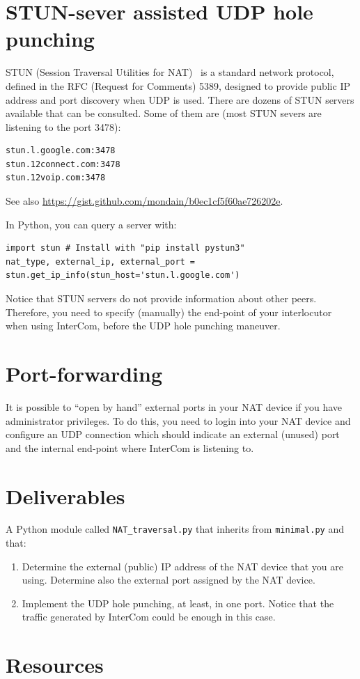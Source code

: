 \section{STUN-sever assisted UDP hole punching}

STUN (Session Traversal Utilities for NAT)~\cite{STUN} is a standard
network protocol, defined in the RFC (Request for Comments) 5389,
designed to provide public IP address and port discovery when UDP is
used. There are dozens of STUN servers available that can be
consulted. Some of them are (most STUN severs are listening to the
port 3478):
\begin{verbatim}
stun.l.google.com:3478
stun.12connect.com:3478
stun.12voip.com:3478
\end{verbatim}
See also \url{https://gist.github.com/mondain/b0ec1cf5f60ae726202e}.

In Python, you can query a server with:
\begin{verbatim}
import stun # Install with "pip install pystun3"
nat_type, external_ip, external_port = stun.get_ip_info(stun_host='stun.l.google.com')
\end{verbatim}

Notice that STUN servers do not provide information about other
peers. Therefore, you need to specify (manually) the end-point of your
interlocutor when using InterCom, before the UDP hole punching
maneuver.

\section{Port-forwarding}

It is possible to ``open by hand'' external ports in your NAT device
if you have administrator privileges. To do this, you need to login
into your NAT device and configure an UDP connection which should
indicate an external (unused) port and the internal end-point where
InterCom is listening to.

\section{Deliverables}

A Python module called \texttt{NAT\_traversal.py} that inherits from
\texttt{minimal.py} and that:
\begin{enumerate}
\item Determine the external (public) IP address of the NAT device that you are
  using. Determine also the external port assigned by the NAT device.
\item Implement the UDP hole punching, at least, in one port. Notice
  that the traffic generated by InterCom could be enough in this case.
\end{enumerate}

\section{Resources}


